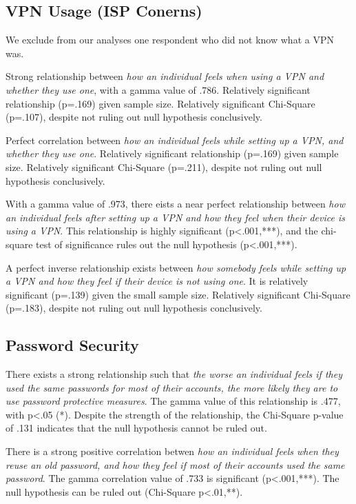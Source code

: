 \documentclass[acmtog]{acmart}
\begin{document}
\subsection{VPN Usage (ISP Conerns)} \label{VPN Usage}
We exclude from our analyses one respondent who did not know what a VPN was.

Strong relationship between \emph{how an individual feels when using a VPN and
whether they use one}, with a gamma value of .786. Relatively significant
relationship (p=.169) given sample size.  Relatively significant Chi-Square
(p=.107), despite not ruling out null hypothesis conclusively.

Perfect correlation between \emph{how an individual feels while setting up a
VPN, and whether they use one}. Relatively significant relationship (p=.169)
given sample size. Relatively significant Chi-Square (p=.211), despite not
ruling out null hypothesis conclusively.

With a gamma value of .973, there eists a near perfect relationship between
\emph{how an individual feels after setting up a VPN and how they feel when
their device is using a VPN}. This relationship is highly significant
(p<.001,***), and the chi-square test of significance rules out the null
hypothesis (p<.001,***).

A perfect inverse relationship exists between \emph{how somebody feels while
setting up a VPN and how they feel if their device is not using one}. It is
relatively significant (p=.139) given the small sample size.  Relatively
significant Chi-Square (p=.183), despite not ruling out null hypothesis
conclusively.

\subsection{Password Security} \label{Password Security}
There exists a strong relationship such that \emph{the worse an individual feels
if they used the same passwords for most of their accounts, the more likely they
are to use password protective measures}.  The gamma value of this relationship
is .477, with p<.05 (*). Despite the strength of the relationship, the
Chi-Square p-value of .131 indicates that the null hypothesis cannot be ruled
out.

There is a strong positive correlation betwen \emph{how an individual feels when
they reuse an old password, and how they feel if most of their accounts used the
same password}. The gamma correlation value of .733 is significant (p<.001,***).
The null hypothesis can be ruled out (Chi-Square p<.01,**).
\end{document}
